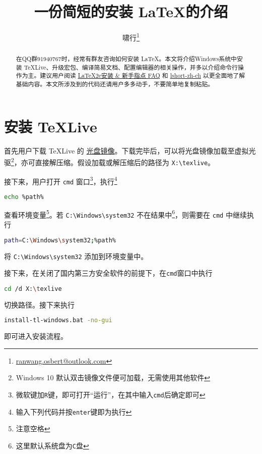 \documentclass{ctexart}
\title{一份简短的安装 \LaTeX 的介绍}
\author{啸行\thanks{\url{ranwang.osbert@outlook.com}}}
\begin{document}
  
\maketitle

\begin{abstract}
  在QQ群91940767时，经常有群友咨询如何安装 \LaTeX。本文将介绍Windows系统中安装 \TeX Live、升级宏包、编译简易文档、配置编辑器的相关操作，并多以介绍命令行操作为主。建议用户阅读 \href{http://www.latexstudio.net/archives/11469.html}{LaTeX2e安装 \& 新手指点 FAQ} 和 \href{http://mirrors.ctan.org/info/lshort/chinese/lshort-zh-cn.pdf}{lshort-zh-ch} 以更全面地了解基础内容。本文所涉及到的代码还请用户多多动手，不要简单地复制粘贴。
\end{abstract}

\section{安装 \TeX Live}
首先用户下载 \TeX Live 的 \href{http://mirrors.ctan.org/systems/texlive/Images/texlive.iso}{光盘镜像}。下载完毕后，可以将光盘镜像加载至虚拟光驱\footnote{Windows 10 默认双击镜像文件便可加载，无需使用其他软件}，亦可直接解压缩。假设加载或解压缩后的路径为 \verb|X:\texlive|。

接下来，用户打开 \verb|cmd| 窗口\footnote{微软键加\texttt{R}键，即可打开“运行”，在其中输入\texttt{cmd}后确定即可}，执行\footnote{输入下列代码并按\texttt{enter}键即为执行}
\begin{lstlisting}[language = bash]
  echo %path%
\end{lstlisting}
查看环境变量\footnote{注意空格}。若 \verb|C:\Windows\system32| 不在结果中\footnote{这里默认系统盘为\texttt{C}盘}，则需要在 \verb|cmd| 中继续执行
\begin{lstlisting}[language = bash]
  path=C:\Windows\system32;%path%
\end{lstlisting}
将 \verb|C:\Windows\system32| 添加到环境变量中。

接下来，在关闭了国内第三方安全软件的前提下，在\texttt{cmd}窗口中执行
\begin{lstlisting}[language = bash]
  cd /d X:\texlive
\end{lstlisting}
切换路径。接下来执行
\begin{lstlisting}[language = bash]
  install-tl-windows.bat -no-gui
\end{lstlisting}
即可进入安装流程。
\end{document}
